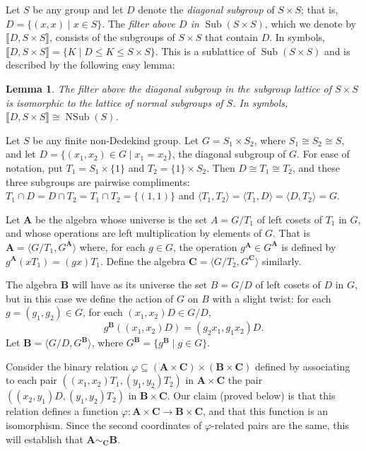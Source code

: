\documentclass{au}
\theoremstyle{plain}
\newtheorem{lemma}{Lemma}
\theoremstyle{definition}
\newcounter{claim}
\theoremstyle{remark}
\newcommand{\<}{\ensuremath{\langle}}
\renewcommand{\>}{\ensuremath{\rangle}}
\renewcommand{\phi}{\ensuremath{\varphi}}
\newcommand{\lb}{\ensuremath{\llbracket}}
\newcommand{\rb}{\ensuremath{\rrbracket}}
\newcommand{\bA}{\ensuremath{\mathbf{A}}}
\newcommand{\bB}{\ensuremath{\mathbf{B}}}
\newcommand{\bC}{\ensuremath{\mathbf{C}}}
\renewcommand{\leq}{\ensuremath{\leqslant}}
\newcommand{\Sub}{\ensuremath{\operatorname{Sub}}}
\newcommand{\NSub}{\ensuremath{\operatorname{NSub}}}
\renewcommand{\phi}{\ensuremath{\varphi}}
\begin{document}
Let $S$ be any group and let $D$ denote the \emph{diagonal subgroup} of 
$S\times S$; that is, $D = \{(x,x) \mid x\in S\}$.
The \emph{filter above $D$ in} $\Sub(S\times S)$, which we denote by
$\lb D, S\times S\rb$, %
consists of the subgroups of $S\times S$ that contain $D$.  In symbols,
$\lb D, S\times S\rb = \{K \mid D \leq K \leq S\times S\}$.  
This is a sublattice of $\Sub(S\times S)$ and is described by the following easy lemma:
\begin{lemma}
\label{lem:1}
  The filter above the diagonal subgroup in the subgroup lattice of $S\times S$
  is isomorphic to the lattice of normal subgroups of $S$. In symbols, 
$\lb D, S\times S\rb \cong \NSub(S)$.
\end{lemma}

Let $S$ be any finite non-Dedekind group. Let $G = S_1 \times S_2$, where
$S_1 \cong S_2 \cong S$, and let $D = \{(x_1,x_2)\in G \mid x_1 = x_2\}$,  the
diagonal subgroup of $G$. For ease of notation, put $T_1 = S_1 \times \{1\}$ and 
$T_2 = \{1\}\times S_2$.
Then $D \cong T_1 \cong T_2$, and these three 
subgroups are pairwise compliments: $T_1\cap D = D\cap T_2 = T_1 \cap T_2 =
\{(1,1)\}$ and $ \<T_1, T_2\> = \<T_1,D\> = \<D, T_2\> = G$.

Let $\bA$ be the algebra whose universe is the set $A = G/T_1$ of left
cosets of $T_1$ in $G$, and whose operations are left multiplication by elements
of $G$. 
That is $\bA = \< G/T_1, G^{\bA}\>$ 
where, for each $g\in G$, the operation $g^{\bA} \in G^{\bA}$ is defined by
$g^{\bA}(xT_1) = (gx)T_1$.
Define the algebra $\bC = \< G/T_2, G^{\bC}\>$ similarly.  

The algebra $\bB$
will have as its universe the set $B = G/D$ of left cosets of $D$ in $G$, but in
this case we define the action of $G$ on $B$ with a slight twist:  for
each $g = (g_1, g_2) \in G$,
for each $(x_1, x_2)D \in G/D$,
\[
g^{\bB}((x_1,x_2)D) =  (g_2x_1, g_1 x_2)D.
\]
Let $\bB = \< G/D, G^{\bB}\>$, where $G^{\bB} =  \{g^{\bB} \mid g\in G\}$.

Consider the binary relation 
$\phi \subseteq (\bA \times \bC) \times (\bB \times \bC)$ defined by associating
to each pair $((x_1,x_2)T_1, (y_1,y_2)T_2)$ in $\bA \times \bC$
 the pair $((x_2, y_1)D, (y_1,y_2)T_2)$ in $\bB \times \bC$.
Our claim (proved below) is that this relation defines a function 
$\phi \colon \bA \times \bC \rightarrow \bB \times \bC$, 
and that this function is an isomorphism. Since the second coordinates of
$\phi$-related pairs are the same, this will establish that $\bA\sim_{\bC}\bB$. 
\end{document}
